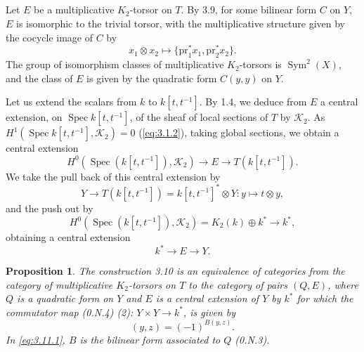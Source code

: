 \documentclass[11pt,a4paper]{article}
\theoremstyle{plain}
\newtheorem{proposition}[theorem]{Proposition}
\theoremstyle{definition}
\DeclareMathOperator{\Spec}{Spec}
\DeclareMathOperator{\Sym}{Sym}
\newcommand{\cK}{\mathcal{K}}
\newcommand{\pr}{\mathrm{pr}}
\begin{document}
\subsection{}
Let $E$ be a multiplicative $K_2$-torsor on $T$. By 3.9, for some bilinear form $C$ on $Y$, $E$ is isomorphic to the trivial torsor, with the multiplicative structure given by the cocycle image of $C$ by
\begin{equation}\label{eq:3.9.3}
x_1 \otimes x_2 \mapsto \{\pr_1^* x_1, \pr_2^* x_2\}.
\end{equation}
The group of isomorphism classes of multiplicative $K_2$-torsors is $\Sym^2(X)$, and the class of $E$ is given by the quadratic form $C(y,y)$ on $Y$.

Let us extend the scalars from $k$ to $k[t, t^{-1}]$. By 1.4, we deduce from $E$ a central extension, on $\Spec k[t, t^{-1}]$, of the sheaf of local sections of $T$ by $\cK_2$. As $H^1(\Spec k[t,t^{-1}], \cK_2) = 0$ (\eqref{eq:3.1.2}), taking global sections, we obtain a central extension
\begin{equation}\label{eq:3.10.1}
H^0(\Spec(k[t,t^{-1}]), \cK_2) \to E \to T(k[t,t^{-1}]).
\end{equation}
We take the pull back of this central extension by
\begin{equation}\label{eq:3.10.2}
Y \to T(k[t,t^{-1}]) = k[t,t^{-1}]^* \otimes Y: y \mapsto t \otimes y,
\end{equation}
and the push out by
\begin{equation}\label{eq:3.10.3}
H^0(\Spec(k[t,t^{-1}]), \cK_2) = K_2(k) \oplus k^* \to k^*,
\end{equation}
obtaining a central extension
\begin{equation}\label{eq:3.10.4}
k^* \to E \to Y.
\end{equation}

\begin{proposition}\label{prop:3.11}
The construction 3.10 is an equivalence of categories from the category of multiplicative $K_2$-torsors on $T$ to the category of pairs $(Q, E)$, where $Q$ is a quadratic form on $Y$ and $E$ is a central extension of $Y$ by $k^*$ for which the commutator map \textup{(0.N.4)} (2): $Y \times Y \to k^*$, is given by
\begin{equation}\label{eq:3.11.1}
(y, z) = (-1)^{B(y,z)}.
\end{equation}
In \eqref{eq:3.11.1}, $B$ is the bilinear form associated to $Q$ \textup{(0.N.3)}.
\end{proposition}
\end{document}
